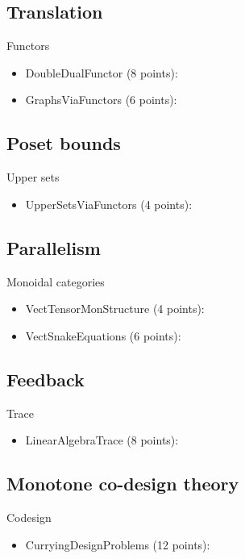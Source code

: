 \subsection{Translation}

Functors
\begin{itemize}
    \item DoubleDualFunctor (8 points): 
    \item GraphsViaFunctors (6 points): 
\end{itemize}




\subsection{Poset bounds}
Upper sets
\begin{itemize}
    \item UpperSetsViaFunctors (4 points): 
\end{itemize}


\subsection{Parallelism}

Monoidal categories
\begin{itemize}
    \item VectTensorMonStructure (4 points): 
    \item VectSnakeEquations (6 points): 
\end{itemize}



\subsection{Feedback}

Trace
\begin{itemize}
    \item LinearAlgebraTrace (8 points): 
\end{itemize}

\subsection{Monotone co-design theory}

Codesign
\begin{itemize}
    \item CurryingDesignProblems (12 points): 
\end{itemize}



